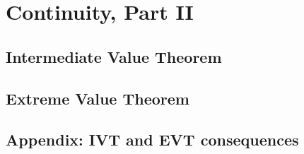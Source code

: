\section{Continuity, Part II}

\subsection{Intermediate Value Theorem} \label{ivt}
\subsection{Extreme Value Theorem}
\subsection{Appendix: IVT and EVT consequences}

